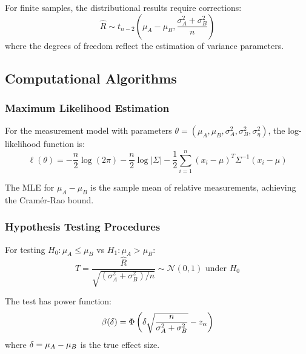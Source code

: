 For finite samples, the distributional results require corrections:
\begin{equation}
\hat{R} \sim t_{n-2}\left(\mu_A - \mu_B, \frac{\sigma_A^2 + \sigma_B^2}{n}\right)
\end{equation}
where the degrees of freedom reflect the estimation of variance parameters.

\subsection{Computational Algorithms}

\subsubsection{Maximum Likelihood Estimation}

For the measurement model with parameters $\theta = (\mu_A, \mu_B, \sigma_A^2, \sigma_B^2, \sigma_\eta^2)$, the log-likelihood function is:
\begin{equation}
\ell(\theta) = -\frac{n}{2} \log(2\pi) - \frac{n}{2} \log|\Sigma| - \frac{1}{2} \sum_{i=1}^n (x_i - \mu)^T \Sigma^{-1} (x_i - \mu)
\end{equation}

The MLE for $\mu_A - \mu_B$ is the sample mean of relative measurements, achieving the Cramér-Rao bound.

\subsubsection{Hypothesis Testing Procedures}

For testing $H_0: \mu_A \leq \mu_B$ vs $H_1: \mu_A > \mu_B$:
\begin{equation}
T = \frac{\hat{R}}{\sqrt{(\sigma_A^2 + \sigma_B^2)/n}} \sim \mathcal{N}(0,1) \text{ under } H_0
\end{equation}

The test has power function:
\begin{equation}
\beta(\delta) = \Phi\left(\delta\sqrt{\frac{n}{\sigma_A^2 + \sigma_B^2}} - z_\alpha\right)
\end{equation}
where $\delta = \mu_A - \mu_B$ is the true effect size.